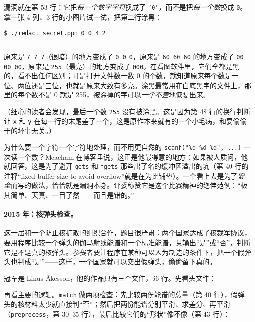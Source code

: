 漏洞就在第 53 行：它把\emph{每一个数字字符}换成了 \texttt{'0'}，而不是把\emph{每一个数}换成 \texttt{0}。拿一张 4 列、3 行的小图片试一试，把第二行涂黑：
\begin{verbatim}
$ ./redact secret.ppm 0 0 4 2
\end{verbatim}
\inputminted[linenos=false]{text}{code/appc/out/redacted.ppm}

原来是 \texttt{7 7 7}（很暗）的地方变成了 \texttt{0 0 0}，原来是 \texttt{60 60 60} 的地方变成了 \texttt{00 00 00}，原来是 \texttt{255}（最亮）的地方变成了 \texttt{000}。在看图软件里，它们全都是黑的，看不出任何区别；可是打开文件数一数 0 的个数，就知道原来每个数是一位、两位还是三位，也就是原来大致有多亮。涂黑最常用在白底黑字的文件上，那里的每个数不是 0 就是 255，被涂掉的字可以\emph{一个不差}地恢复出来。

（细心的读者会发现，最后一个数 \texttt{255} 没有被涂黑。这是因为第 48 行的换行判断让 \texttt{x} 和 \texttt{y} 在每一行的末尾差了一个，这是原作本来就有的一个小毛病，和要偷偷干的坏事无关。）

为什么要一个字符一个字符地处理，而不用更自然的 \texttt{scanf("\%d \%d \%d", ...)} 一次读一个数？Meacham 在博客里说，这正是他最得意的地方：如果被人质问，他就回答，这是为了避开 \texttt{gets} 和 \texttt{fgets} 那些出了名的缓冲区溢出的坑（第 40 行的注释“fixed buffer size to avoid overflow”就是在为此铺垫）。一个看上去是为了\emph{安全}而写的做法，恰恰就是漏洞本身。评委称赞它是这个比赛精神的绝佳范例：“极其简单、天真、一目了然——而且是错的。”

\paragraph{2015 年：核弹头检查。}
这一届和一个防止核扩散的组织合作，题目很严肃：两个国家达成了核裁军协议，要用程序比较一个弹头的伽马射线能谱和一个标准能谱，只输出“是”或“否”，判断它是不是真的核弹头。参赛者要让程序在某种可以人为制造的条件下，把一个假弹头也判成“是”——这样，一个国家就可以交出假弹头，偷偷留下真的。

冠军是 Linus Åkesson，他的作品只有三个文件，66 行。先看头文件：


再看主要的逻辑。\texttt{match} 做两项检查：先比较两份能谱的总量（第 40 行），假弹头的核材料太少就直接判“否”；然后把两份能谱分别平滑、求差分、再平滑（\texttt{preprocess}，第 30--35 行），最后比较它们的“形状”像不像（第 43 行）：


